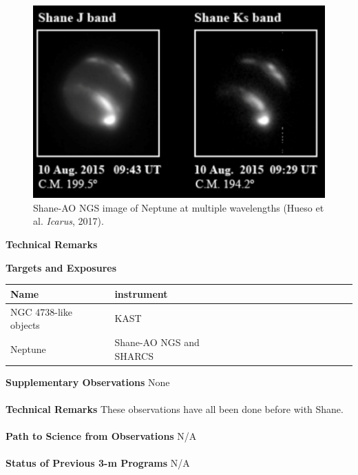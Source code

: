 \documentclass[12pt]{article}
\begin{document}
\begin{figure}[t!]
  \centering
\includegraphics[width=15cm]{fig2.pdf}
  \caption{Shane-AO NGS image of Neptune at multiple wavelengths (Hueso et al. \textit{Icarus}, 2017).}
\end{figure}

\clearpage

\newpage

\centerline{\bf Technical Remarks}

\noindent
{\bf Targets and Exposures}

\begin{table}[!h]
\begin{tabular}{lllllllllllll}
\hline
Name & instrument \\
\hline
NGC 4738-like objects             & KAST\\
Neptune             & Shane-AO NGS and SHARCS  \\
\hline
\end{tabular}
\end{table}
\noindent
{\bf Supplementary Observations}
None
\\\\
\noindent
{\bf Technical Remarks}
These observations have all been done before with Shane.
\\\\
\noindent
{\bf Path to Science from Observations}
N/A
\\\\
\noindent
{\bf Status of Previous 3-m Programs}
N/A
\end{document}
